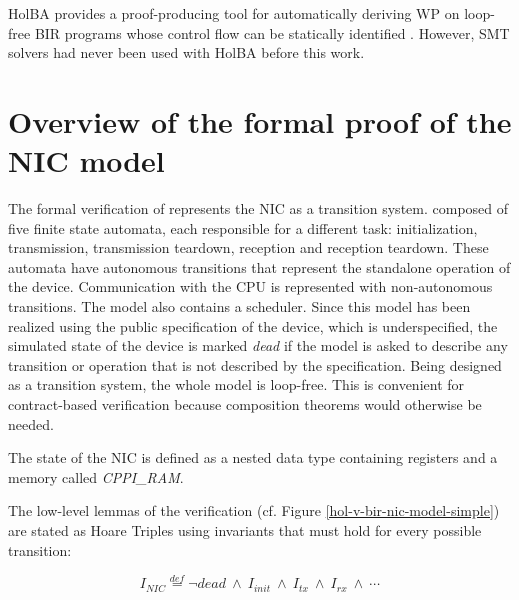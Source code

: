 \documentclass[10pt,a4paper]{article}
\newcommand{\eqdef}{\stackrel{def}{=}}
\begin{document}
\begin{multicols}{2}
{HolBA} provides a {proof-producing} tool for automatically deriving WP on loop-free {BIR} programs whose control flow can be statically identified \cite{lindner_trabin:_2019}. However, SMT solvers had never been used with HolBA before this work.


\section{Overview of the formal proof of the NIC model} \label{overview-nic-proof}

The formal verification of \cite{haglund_formal_2016} represents the NIC as a transition system. composed of five finite state automata, each responsible for a different task: initialization, transmission, transmission teardown, reception and reception teardown. These automata have autonomous transitions that represent the standalone operation of the device. Communication with the CPU is represented with non-autonomous transitions. The model also contains a scheduler. Since this model has been realized using the public specification of the device, which is underspecified, the simulated state of the device is marked \textit{dead} if the model is asked to describe any transition or operation that is not described by the specification.
Being designed as a transition system, the whole model is loop-free. This is convenient for contract-based verification because composition theorems would otherwise be needed.

The state of the NIC is defined as a nested data type containing registers and a memory called \textit{CPPI\_RAM}.

The low-level lemmas of the verification (cf. Figure \ref{hol-v-bir-nic-model-simple}) are stated as Hoare Triples using invariants that must hold for every possible transition:
%
\begin{small}
  \begin{equation}
    \label{nic-proof-invariant-shape}
    I_{NIC} \eqdef \neg dead~\land~I_{init}~\land~I_{tx}~\land~I_{rx}~\land~\cdots
  \end{equation}
\end{small}


\end{multicols}
\end{document}
